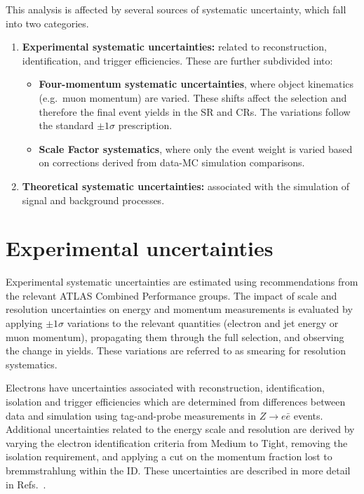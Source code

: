 This analysis is affected by several sources of systematic uncertainty, which fall into two categories.

\begin{enumerate}
  \item \textbf{Experimental systematic uncertainties:} related to reconstruction, identification, and trigger efficiencies. These are further subdivided into:
        \begin{itemize}
          \item \textbf{Four-momentum systematic uncertainties}, where object kinematics (e.g.\ muon momentum) are varied. These shifts affect the selection and therefore the final event yields in the SR and CRs. The variations follow the standard $\pm1\sigma$ prescription.
          \item \textbf{Scale Factor systematics}, where only the event weight is varied based on corrections derived from data-MC simulation comparisons.
        \end{itemize}
  \item \textbf{Theoretical systematic uncertainties:} associated with the simulation of signal and background processes.
\end{enumerate}

\section{Experimental uncertainties}\label{sec:experimental_systematics}
Experimental systematic uncertainties are estimated using recommendations from the relevant ATLAS Combined Performance groups. The impact of scale and resolution uncertainties on energy and momentum measurements is evaluated by applying $\pm1\sigma$ variations to the relevant quantities (electron and jet energy or muon momentum), propagating them through the full selection, and observing the change in yields. These variations are referred to as smearing for resolution systematics.

Electrons have uncertainties associated with reconstruction, identification, isolation and trigger efficiencies which are determined from differences between data and simulation using tag-and-probe measurements in $Z\to e\bar{e}$ events. Additional uncertainties related to the energy scale and resolution are derived by varying the electron identification criteria from Medium to Tight, removing the isolation requirement, and applying a cut on the momentum fraction lost to bremmstrahlung within the ID. These uncertainties are described in more detail in Refs.~\cite{ATLAS:2023mnw, ATLAS:2023dxj}.

